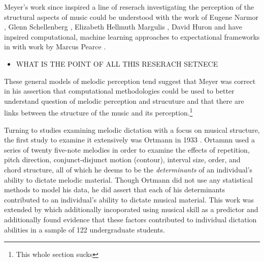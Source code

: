 \documentclass[]{book}
\providecommand{\tightlist}{%
  \setlength{\itemsep}{0pt}\setlength{\parskip}{0pt}}
\let\rmarkdownfootnote\footnote%
\def\footnote{\protect\rmarkdownfootnote}
\begin{document}
Meyer's work since inspired a line of reserach investigating the perception of the structural aspects of music could be understood with the work of Eugene Narmor \citep{narmourAnalysisCognitionBasic1990, narmourAnalysisCognitionMelodic1992}, Glenn Schellenberg \citep{schellenbergSimplifyingImplicationRealizationModel1997}, Elizabeth Hellmuth Margulis \citep{margulisModelMelodicExpectation2005}, David Huron \citep{huronSweetAnticipation2006} and have inpsired computational, machine learning approaches to expectational frameworks in with work by Marcus Pearce \citep{pearceAuditoryExpectationInformation2012}.

\begin{itemize}
\tightlist
\item
  WHAT IS THE POINT OF ALL THIS RESERACH SETNECE
\end{itemize}

These general models of melodic perception tend suggest that Meyer was correct in his assertion that computational methodologies could be used to better understand question of melodic perception and strucuture and that there are links between the structure of the music and its perception.\footnote{This whole section sucks}

Turning to studies examining melodic dictation with a focus on musical structure, the first study to examine it extensively was Ortmann in 1933 \citep{ortmannTonalDeterminantsMelodic1933}.
Ortamnn used a series of twenty five-note melodies in order to examine the effects of repetition, pitch direction, conjunct-disjunct motion (contour), interval size, order, and chord structure, all of which he deems to be the \emph{determinants} of an individual's ability to dictate melodic material.
Though Ortmann did not use any statistical methods to model his data, he did assert that each of his determinants contributed to an individual's ability to dictate musical material.
This work was extended by \citep{taylorStrategiesMemoryShort1983} which additionally incoporated using musical skill as a predictor and additionally found evidence that these factors contributed to individual dictation abilities in a sample of 122 undergraduate students.
\end{document}
